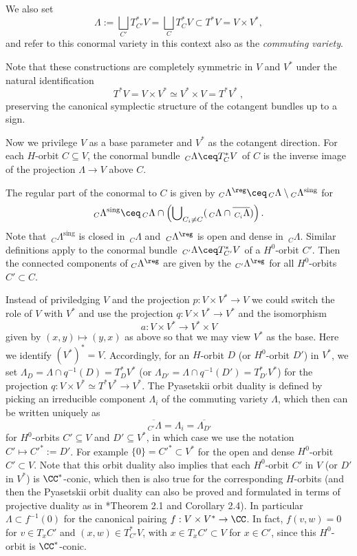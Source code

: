 \documentclass[11pt,letterpaper]{amsart}
\numberwithin{equation}{section}
\begin{document}
We also set 
\[
\Lambda := \bigsqcup_{C'} T^*_{C'}V = \bigsqcup_{C} T^*_{C}V \subset T^*V = V\times V^*,
\]
and refer to this conormal variety in this context also as the {\it commuting variety}. 


Note that these constructions are completely symmetric in $V$ and $V^*$ under the natural identification
$$T^*V = V\times V^* \simeq V^*\times V=T^*V^* \:,$$
preserving the canonical symplectic structure of the cotangent bundles up to a sign.

Now we privilege $V$ as a base parameter and $V^*$ as the cotangent direction. 
For each $H$-orbit $C\subseteq V$, the
conormal bundle  $\,_C\Lambda \ceq T^*_{C}V$ of $C$ is  the inverse image of the projection $\Lambda \to V$ above $C$.

The regular part of the conormal to $C$ is given by
${}_C\Lambda^\reg \ceq \,_C\Lambda \setminus {}_C\Lambda^\textrm{sing}$ for 
\[
{}_C\Lambda^\textrm{sing} \ceq \,_C\Lambda \cap \left( \operatorname{\bigcup}\limits_{C_i\ne C} (\,_{C}\Lambda \cap \overline{\,_{C_i}\Lambda})\right).
\]
Note that  $\,_C\Lambda^\textrm{sing}$ is closed in $\,_C\Lambda$ and $\,_C\Lambda^\reg$ is open and dense in $\,_C\Lambda$.
Similar definitions apply to the conormal bundle $\,_{C'}\Lambda \ceq T^*_{C'}V$ of a $H^0$-orbit $C'$.
Then the connected components of ${}_C\Lambda^\reg$ are given by the ${}_{C'}\Lambda^\reg$ for all $H^0$-orbits $C'\subset C$.

Instead of priviledging $V$ and the projection $p: V\times V^* \to V$ we could switch the role of $V$ with $V^*$ and use the projection $q : V\times V^* \to V^*$ and  the isomorphism $$a : V\times V^* \to V^*\times V$$ given by $(x,y) \mapsto (y,x)$ 
as above so that we may view $V^*$ as the base.
Here we identify $(V^*)^* =V$.
Accordingly, for an $H$-orbit $D$ (or $H^0$-orbit $D'$) in $V^*$, we set 
$\Lambda_{D}= \Lambda\cap q^{-1}(D)= T^*_DV^*$ (or $\Lambda_{D'}= \Lambda\cap q^{-1}(D')= T^*_{D'}V^*$)
for the projection $q : V\times V^*\simeq T^*V^* \to V^*$.
The Pyasetskii orbit duality \cite{Pja75} is defined by picking an irreducible component $\Lambda_i$ of the commuting variety $\Lambda$, which then can be written uniquely as
\[
\overline{\,_{C'}\Lambda}
=
\Lambda_i
= 
\overline{\Lambda_{D'}}
\]
for $H^0$-orbits $C'\subseteq V$ and $D'\subseteq V^*$, in which case we use the notation $C'\mapsto C'^* :=D'$.
For example $\{0\}=C'^*\subset V^*$ for the open and dense $H^0$-orbit $C'\subset V$.
Note that this orbit duality also implies that each $H^0$-orbit $C'$ in $V$ (or $D'$ in $V^*$) is
$\CC^*$-conic, which then is also true for the corresponding $H$-orbits (and then the Pyasetskii orbit duality can also be proved and formulated in terms of projective duality as in \cite{Tev05}*{Theorem 2.1 and Corollary 2.4}).
In particular $\Lambda\subset f^{-1}(0)$ for the canonical pairing $f: V\times V^* \to \CC$.
In fact, $f(v,w)=0$ for $v\in T_xC'$ and $(x,w)\in T^*_{C'}V$, with $x\in T_xC'\subset V$ for $x\in C'$, since this 
$H^0$-orbit is $\CC^*$-conic.
\end{document}
